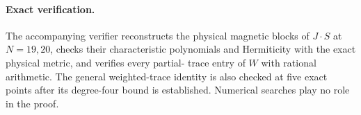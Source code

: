 \documentclass[11pt]{article}
\begin{document}
\paragraph{Exact verification.}
The accompanying verifier reconstructs the physical magnetic blocks of
$J\cdot S$ at $N=19,20$, checks their characteristic polynomials and
Hermiticity with the exact physical metric, and verifies every partial-
trace entry of $W$ with rational arithmetic. The general weighted-trace
identity is also checked at five exact points after its degree-four
bound is established. Numerical searches play no role in the proof.
\end{document}
